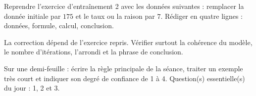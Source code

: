
\begin{homework}Reprendre l'exercice d'entraînement 2 avec les données suivantes : remplacer la donnée initiale par $175$ et le taux ou la raison par $7$. Rédiger en quatre lignes : données, formule, calcul, conclusion.\end{homework}
\begin{solution}La correction dépend de l'exercice repris. Vérifier surtout la cohérence du modèle, le nombre d'itérations, l'arrondi et la phrase de conclusion.\end{solution}

\begin{exitticket}[3 minutes]Sur une demi-feuille : écrire la règle principale de la séance, traiter un exemple très court et indiquer son degré de confiance de 1 à 4. Question(s) essentielle(s) du jour : 1, 2 et 3.\end{exitticket}

